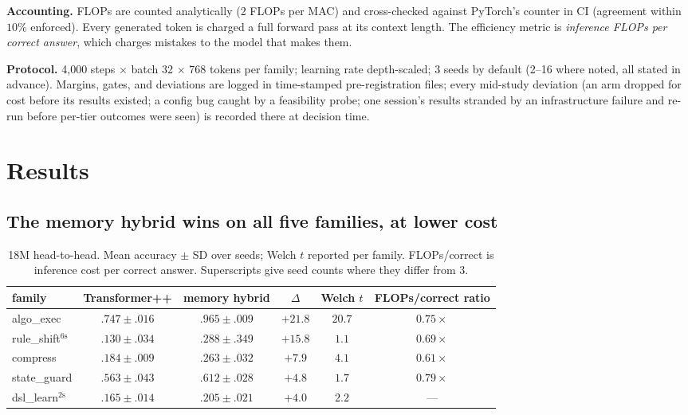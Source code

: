 \documentclass[10pt]{article}
\begin{document}
\textbf{Accounting.} FLOPs are counted analytically (2 FLOPs per MAC) and
cross-checked against PyTorch's counter in CI (agreement within $10\%$
enforced). Every generated token is charged a full forward pass at its context
length. The efficiency metric is \emph{inference FLOPs per correct answer},
which charges mistakes to the model that makes them.

\textbf{Protocol.} 4{,}000 steps $\times$ batch 32 $\times$ 768 tokens
per family; learning rate depth-scaled; 3 seeds by default (2--16 where noted,
all stated in advance). Margins, gates, and deviations are logged in
time-stamped pre-registration files; every mid-study deviation (an arm dropped
for cost before its results existed; a config bug caught by a feasibility
probe; one session's results stranded by an infrastructure failure and re-run
before per-tier outcomes were seen) is recorded there at decision time.

\section{Results}

\subsection{The memory hybrid wins on all five families, at lower cost}

\begin{table}[h]
\centering\small
\caption{18M head-to-head. Mean accuracy $\pm$ SD over seeds; Welch $t$
reported per family. FLOPs/correct is inference cost per correct answer.
Superscripts give seed counts where they differ from 3.}
\label{tab:main}
\begin{tabular}{lccccc}
\toprule
family & Transformer++ & memory hybrid & $\Delta$ & Welch $t$ & FLOPs/correct ratio \\
\midrule
algo\_exec   & $.747\pm.016$ & $\mathbf{.965\pm.009}$ & $+21.8$ & $20.7$ & $0.75\times$ \\
rule\_shift$^{6\mathrm{s}}$ & $.130\pm.034$ & $\mathbf{.288\pm.349}$ & $+15.8$ & $1.1$ & $0.69\times$ \\
compress     & $.184\pm.009$ & $\mathbf{.263\pm.032}$ & $+7.9$  & $4.1$  & $0.61\times$ \\
state\_guard & $.563\pm.043$ & $\mathbf{.612\pm.028}$ & $+4.8$  & $1.7$  & $0.79\times$ \\
dsl\_learn$^{2\mathrm{s}}$   & $.165\pm.014$ & $\mathbf{.205\pm.021}$ & $+4.0$  & $2.2$  & --- \\
\bottomrule
\end{tabular}
\end{table}
\end{document}
